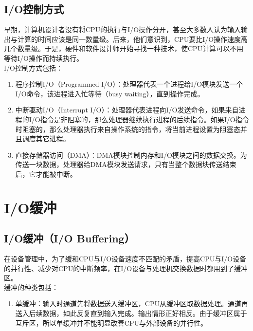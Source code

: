 \subsection{I/O控制方式}

早期，计算机设计者没有将CPU的执行与I/O操作分开，甚至大多数人认为输入输出与计算的时间应该是同一数量级。后来，他们意识到，CPU要比I/O操作速度高几个数量级。于是，硬件和软件设计师开始寻找一种技术，使CPU计算可以不用等待I/O操作而持续执行。 \\

I/O控制方式包括：

\begin{enumerate}
    \item 程序控制I/O（Programmed I/O）：处理器代表一个进程给I/O模块发送一个I/O命令，该进程进入忙等待（busy waiting），直到操作完成。
    
    \item 中断驱动I/O（Interrupt I/O）：处理器代表进程向I/O发送命令，如果来自进程的I/O指令是非阻塞的，那么处理器继续执行进程的后续指令。如果I/O指令时阻塞的，那么处理器执行来自操作系统的指令，将当前进程设置为阻塞态并且调度其它进程。
    
    \item 直接存储器访问（DMA）：DMA模块控制内存和I/O模块之间的数据交换。为传送一块数据，处理器给DMA模块发送请求，只有当整个数据块传送结束后，它才能被中断。
\end{enumerate}

\newpage

\section{I/O缓冲}

\subsection{I/O缓冲（I/O Buffering）}

在设备管理中，为了缓和CPU与I/O设备速度不匹配的矛盾，提高CPU与I/O设备的并行性、减少对CPU的中断频率，在I/O设备与处理机交换数据时都用到了缓冲区。 \\

缓冲的种类包括：

\begin{enumerate}
    \item 单缓冲：输入时通道先将数据送入缓冲区，CPU从缓冲区取数据处理。通道再送入后续数据，如此反复直到输入完成。输出情形正好相反。由于缓冲区属于互斥区，所以单缓冲并不能明显改善CPU与外部设备的并行性。
\end{enumerate}